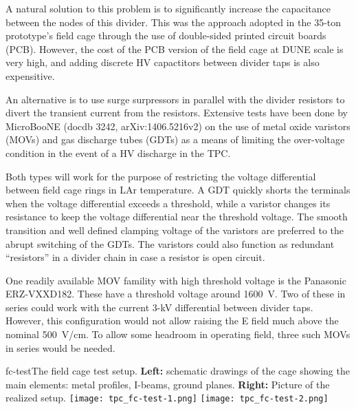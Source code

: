 A natural solution to this problem is to significantly increase the capacitance between the nodes of this divider. This was the approach adopted in the 35-ton prototype's field cage through the use of double-sided printed circuit boards (PCB).  However, the cost of the PCB version of the field cage at DUNE scale is very high, and adding discrete HV capactitors between divider taps is also expensitive.

An alternative is to use surge surpressors in parallel with the divider resistors to divert the transient current from the resistors. Extensive tests have been done by MicroBooNE (docdb 3242, arXiv:1406.5216v2)  on the use of metal oxide varistors (MOVs) and gas discharge tubes (GDTs) as a means of limiting the over-voltage condition in the event of a HV discharge in the TPC. 

Both types will work for the purpose of restricting the voltage differential between field cage rings in LAr temperature. 
A GDT quickly shorts the terminals when the voltage differential exceeds a threshold, while
a varistor changes its resistance to keep the voltage differential near the threshold voltage.
The smooth transition and well defined clamping voltage of the varistors are preferred to the abrupt switching of the GDTs.
The varistors could also function as redundant ``resistors'' in a divider chain in case a resistor is open circuit. 

One readily available MOV famility  with high threshold voltage is the Panasonic ERZ-VXXD182.  These have a threshold voltage around 1600~V.  Two of these in series could work with the current 3-kV differential between divider taps.  However, this configuration would not allow raising the E field much above the nominal 500~V/cm.  To allow some headroom in operating field, three such MOVs in series would be needed.



\begin{cdrfigure}{fc-test}{The field cage test setup. 
 {\bf Left:} schematic drawings of the cage showing the main elements: metal profiles, I-beams, ground planes.
  {\bf Right:} Picture of the realized setup.}
\texttt{[image: tpc\_fc-test-1.png]}
\texttt{[image: tpc\_fc-test-2.png]}
\end{cdrfigure}



